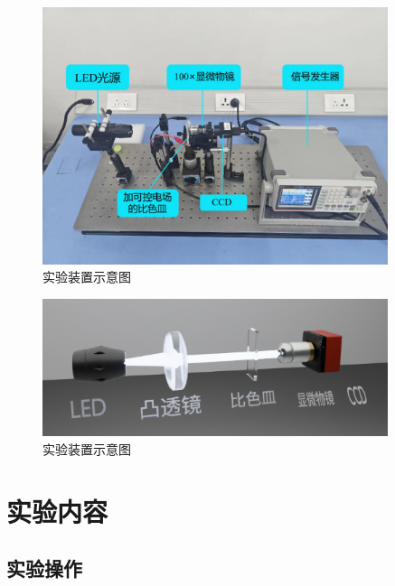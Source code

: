 \documentclass[a4paper]{report} %
\begin{document}
\begin{figure}[H]
    \centering
    \includegraphics[width=0.9\textwidth]{完整实验装置.jpg}
    \caption{实验装置示意图}
    \label{fig:allsetup}
\end{figure}
\begin{figure}[H]
    \centering
    \includegraphics[width=0.9\textwidth]{实验示意图.png}
    \caption{实验装置示意图}
    \label{fig:sets}
\end{figure} 
\chapter{实验内容}

\section{实验操作}
\end{document}
